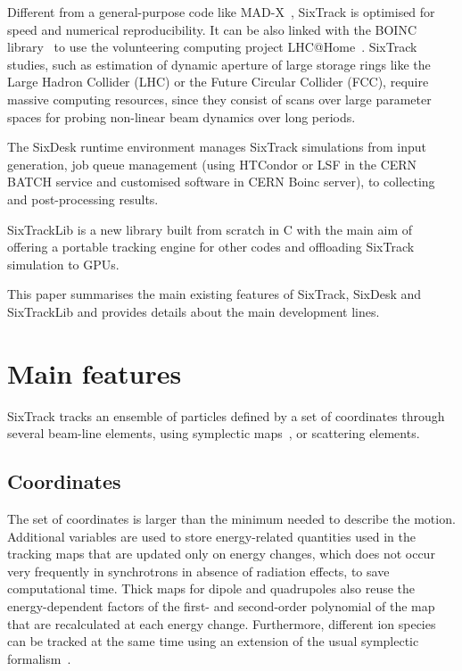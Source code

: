 \documentclass{ws-ijmpa}
\begin{document}
Different from a general-purpose code like MAD-X~\cite{madx, madxICAP18}, SixTrack is optimised for speed and numerical reproducibility. It can be also linked with the BOINC library~\cite{BOINC} to use the volunteering computing project LHC@Home~\cite{lhcathome}.
SixTrack studies, such as estimation of dynamic aperture of large storage rings like the Large Hadron Collider (LHC) or the Future Circular Collider (FCC), require massive computing resources, since they consist of scans over large parameter spaces for probing non-linear beam dynamics over long periods.

The SixDesk runtime environment manages SixTrack simulations from input generation, job queue management (using HTCondor or LSF in the CERN BATCH service and customised software in CERN Boinc server), to collecting and post-processing results.  

SixTrackLib is a new library built from scratch in C with the main aim of offering a portable tracking engine for other codes and offloading SixTrack simulation to GPUs.

This paper summarises the main existing features of SixTrack, SixDesk and SixTrackLib and provides details about the main development lines.

\section{Main features}

SixTrack tracks an ensemble of particles defined by a set of coordinates through several beam-line elements, using symplectic maps~\cite{ripken95, heinemann95, barber87}, or scattering elements.

\subsection{Coordinates}
The set of coordinates is larger than the minimum needed to describe the motion. Additional variables are used to store energy-related quantities used in the tracking maps that are updated only on energy changes, which does not occur very frequently in synchrotrons in absence of radiation effects, to save computational time. Thick maps for dipole and quadrupoles also reuse the energy-dependent factors of the first- and second-order polynomial of the map that are recalculated at each energy change. Furthermore, different ion species %
can be tracked at the same time using an extension of the usual symplectic formalism~\cite{ions}.
\end{document}
